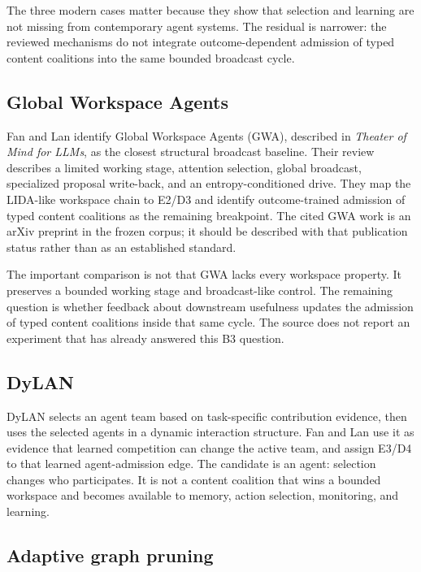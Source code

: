 The three modern cases matter because they show that selection and learning are not missing from contemporary agent systems. The residual is narrower: the reviewed mechanisms do not integrate outcome-dependent admission of typed content coalitions into the same bounded broadcast cycle.

\subsection{Global Workspace Agents}

Fan and Lan identify Global Workspace Agents (GWA), described in \emph{Theater of Mind for LLMs}, as the closest structural broadcast baseline. Their review describes a limited working stage, attention selection, global broadcast, specialized proposal write-back, and an entropy-conditioned drive. They map the LIDA-like workspace chain to E2/D3 and identify outcome-trained admission of typed content coalitions as the remaining breakpoint. The cited GWA work is an arXiv preprint in the frozen corpus; it should be described with that publication status rather than as an established standard.\autocite{shang2026theaterofmind}

The important comparison is not that GWA lacks every workspace property. It preserves a bounded working stage and broadcast-like control. The remaining question is whether feedback about downstream usefulness updates the admission of typed content coalitions inside that same cycle. The source does not report an experiment that has already answered this B3 question.

\subsection{DyLAN}

DyLAN selects an agent team based on task-specific contribution evidence, then uses the selected agents in a dynamic interaction structure. Fan and Lan use it as evidence that learned competition can change the active team, and assign E3/D4 to that learned agent-admission edge. The candidate is an agent: selection changes who participates. It is not a content coalition that wins a bounded workspace and becomes available to memory, action selection, monitoring, and learning.\autocite{liu2024dylan}

\subsection{Adaptive graph pruning}

